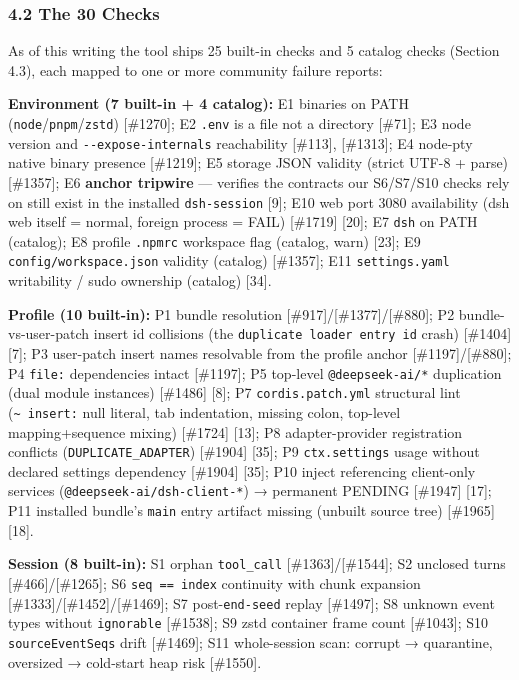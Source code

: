 \documentclass[
]{article}
\begin{document}
\subsubsection{4.2 The 30 Checks}\label{the-30-checks}

As of this writing the tool ships 25 built-in checks and 5 catalog
checks (Section 4.3), each mapped to one or more community failure
reports:

\textbf{Environment (7 built-in + 4 catalog):} E1 binaries on PATH
(\texttt{node}/\texttt{pnpm}/\texttt{zstd}) {[}\#1270{]}; E2
\texttt{.env} is a file not a directory {[}\#71{]}; E3 node version and
\texttt{-\/-expose-internals} reachability {[}\#113{]}, {[}\#1313{]}; E4
node-pty native binary presence {[}\#1219{]}; E5 storage JSON validity
(strict UTF-8 + parse) {[}\#1357{]}; E6 \textbf{anchor tripwire} ---
verifies the contracts our S6/S7/S10 checks rely on still exist in the
installed \texttt{dsh-session} {[}9{]}; E10 web port 3080 availability
(dsh web itself = normal, foreign process = FAIL) {[}\#1719{]} {[}20{]};
E7 \texttt{dsh} on PATH (catalog); E8 profile \texttt{.npmrc} workspace
flag (catalog, warn) {[}23{]}; E9 \texttt{config/workspace.json}
validity (catalog) {[}\#1357{]}; E11 \texttt{settings.yaml} writability
/ sudo ownership (catalog) {[}34{]}.

\textbf{Profile (10 built-in):} P1 bundle resolution
{[}\#917{]}/{[}\#1377{]}/{[}\#880{]}; P2 bundle-vs-user-patch insert id
collisions (the \texttt{duplicate\ loader\ entry\ id} crash)
{[}\#1404{]} {[}7{]}; P3 user-patch insert names resolvable from the
profile anchor {[}\#1197{]}/{[}\#880{]}; P4 \texttt{file:} dependencies
intact {[}\#1197{]}; P5 top-level \texttt{@deepseek-ai/*} duplication
(dual module instances) {[}\#1486{]} {[}8{]}; P7
\texttt{cordis.patch.yml} structural lint
(\texttt{\textasciitilde{}\ insert:} null literal, tab indentation,
missing colon, top-level mapping+sequence mixing) {[}\#1724{]} {[}13{]};
P8 adapter-provider registration conflicts (\texttt{DUPLICATE\_ADAPTER})
{[}\#1904{]} {[}35{]}; P9 \texttt{ctx.settings} usage without declared
settings dependency {[}\#1904{]} {[}35{]}; P10 inject referencing
client-only services (\texttt{@deepseek-ai/dsh-client-*}) → permanent
PENDING {[}\#1947{]} {[}17{]}; P11 installed bundle's \texttt{main}
entry artifact missing (unbuilt source tree) {[}\#1965{]} {[}18{]}.

\textbf{Session (8 built-in):} S1 orphan \texttt{tool\_call}
{[}\#1363{]}/{[}\#1544{]}; S2 unclosed turns {[}\#466{]}/{[}\#1265{]};
S6 \texttt{seq\ ==\ index} continuity with chunk expansion
{[}\#1333{]}/{[}\#1452{]}/{[}\#1469{]}; S7 post-\texttt{end-seed} replay
{[}\#1497{]}; S8 unknown event types without \texttt{ignorable}
{[}\#1538{]}; S9 zstd container frame count {[}\#1043{]}; S10
\texttt{sourceEventSeqs} drift {[}\#1469{]}; S11 whole-session scan:
corrupt → quarantine, oversized → cold-start heap risk {[}\#1550{]}.
\end{document}
